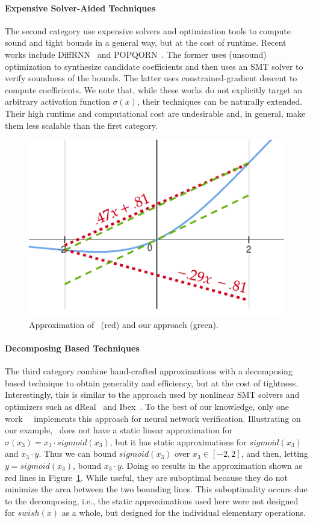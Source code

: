 \paragraph{Expensive Solver-Aided Techniques}
The second category use expensive solvers and optimization tools to compute
sound and tight bounds in a general way, but at the cost of runtime.
%
Recent works include DiffRNN~\cite{mohammadinejad2020diffrnn} and
POPQORN~\cite{ko2019popqorn}. The former uses (unsound) optimization to
synthesize candidate coefficients and then uses an SMT solver to
verify soundness of the bounds. The latter uses constrained-gradient descent to
compute coefficients. We note that, while these works do not
explicitly target an arbitrary activation function $ \sigma(x) $, their
techniques can be naturally extended.
%
Their high runtime and computational cost are undesirable and, in general, make
them less scalable than the first category.

\begin{figure}[t]
	\centering
	\includegraphics[width=.5\linewidth]{offlinesyn/figs/motex-linapprox.pdf}
	\caption{Approximation of~\autolipra{} (red) and our approach
		(green).\label{offlinesyn:fig:motex-linapprox}}
\end{figure}
\paragraph{Decomposing Based Techniques} The third category combine
hand-crafted approximations with a decomposing based technique to obtain
generality and efficiency, but at the cost of tightness. Interestingly, this is
similar to the approach used by nonlinear SMT solvers and optimizers such as
dReal~\cite{gao2013dreal} and Ibex~\cite{chabert2009contractor}.
%
To the best of our knowledge, only one
work~\autolipra{}~\cite{autolipra} implements this approach for neural network
verification.
%
Illustrating on our example,~\autolipra{} does not have a static linear
approximation for $ \sigma(x_3) = x_3 \cdot sigmoid(x_3) $, but it has
static approximations for $ sigmoid(x_3) $ and $ x_3 \cdot y $.
%
Thus we can
bound $ sigmoid(x_3) $ over $ x_3 \in [-2,2] $, and then, letting $ y =
sigmoid(x_3) $, bound $ x_3 \cdot y $. Doing so results in the approximation
shown as red lines in Figure~\ref{offlinesyn:fig:motex-linapprox}.
%
While useful, they are
suboptimal because they do not minimize the area between the two bounding
lines. This suboptimality occurs due to the decomposing, i.e., the static
approximations used here were not designed for $ swish(x) $ as a whole, but designed
for the individual elementary operations.

